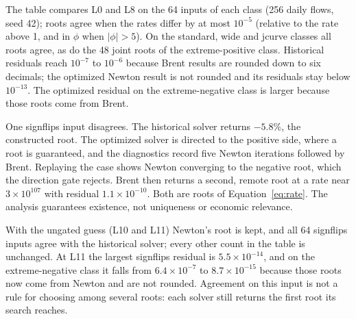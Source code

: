 \documentclass[a4paper,11pt]{article}
\makeatletter
\renewcommand\subsection{\@startsection{subsection}{2}{\z@}{-2ex plus -.7ex minus -.2ex}{.8ex plus .2ex}{\normalfont\large\bfseries}}
\makeatother
\begin{document}
\subsection{Accuracy}\label{sec:accuracy}
\begin{center}\small
\resizebox{0.9\linewidth}{!}{}
\end{center}
The table compares L0 and L8 on the 64 inputs of each class (256 daily flows, seed 42); roots agree when the rates differ by at most $10^{-5}$ (relative to the rate above 1, and in $\phi$ when $|\phi|>5$). On the standard, wide and jcurve classes all roots agree, as do the 48 joint roots of the extreme-positive class. Historical residuals reach $10^{-7}$ to $10^{-6}$ because Brent results are rounded down to six decimals; the optimized Newton result is not rounded and its residuals stay below $10^{-13}$. The optimized residual on the extreme-negative class is larger because those roots come from Brent.

One signflips input disagrees. The historical solver returns $-5.8\%$, the constructed root. The optimized solver is directed to the positive side, where a root is guaranteed, and the diagnostics record five Newton iterations followed by Brent. Replaying the case shows Newton converging to the negative root, which the direction gate rejects. Brent then returns a second, remote root at a rate near $3\times10^{107}$ with residual $1.1\times10^{-10}$. Both are roots of Equation~\eqref{eq:rate}. The analysis guarantees existence, not uniqueness or economic relevance.

With the ungated guess (L10 and L11) Newton's root is kept, and all 64 signflips inputs agree with the historical solver; every other count in the table is unchanged. At L11 the largest signflips residual is $5.5\times10^{-14}$, and on the extreme-negative class it falls from $6.4\times10^{-7}$ to $8.7\times10^{-15}$ because those roots now come from Newton and are not rounded. Agreement on this input is not a rule for choosing among several roots: each solver still returns the first root its search reaches.
\end{document}
